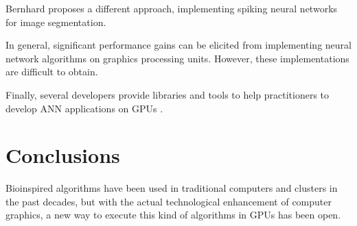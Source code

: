 \documentclass[prodmode,acmtecs]{acmsmall}
\begin{document}
Bernhard \cite{BernhardCITA17} proposes a different approach, implementing spiking neural networks for image segmentation.

In general, significant performance gains can be elicited from implementing neural network algorithms on graphics processing units. However, these implementations are difficult to obtain.

Finally, several developers provide libraries and tools to help practitioners to develop ANN applications on GPUs \cite{url2}.



\section{Conclusions}
\label{sec:conclusions}

Bioinspired algorithms have been used in traditional computers and clusters in 
the past decades, but with the actual technological enhancement of computer graphics, a new way to execute this kind of algorithms in GPUs has been open. 
\end{document}
